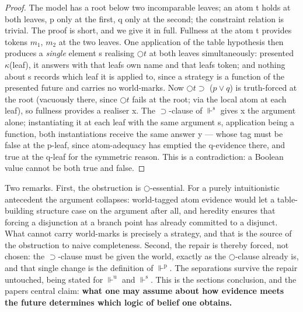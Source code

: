 \begin{proof}
The model has a root below two incomparable leaves; an atom t holds at
both leaves, p only at the first, q only at the second; the constraint
relation is trivial. The proof is short, and we give it in full. Fullness
at the atom t provides tokens \ensuremath{m_{1}}, \ensuremath{m_{2}} at the two leaves. One
application of the table hypothesis then produces a \emph{single} element s
realising \ensuremath{\bigcirc t} at both leaves simultaneously: presented \ensuremath{\kappa}(leaf), it
answers with that leaf\textquotesingle s own name and that leaf\textquotesingle s token; and nothing
about s records which leaf it is applied to, since a strategy is a function
of the presented future and carries no world-marks. Now \ensuremath{\bigcirc t \supset} (\ensuremath{p \vee q}) is
truth-forced at the root (vacuously there, since \ensuremath{\bigcirc t} fails at the root;
via the local atom at each leaf), so fullness provides a realiser x.
The \ensuremath{\supset}-clause of \ensuremath{\Vdash^{\mathrm{s}}} gives x the argument alone; instantiating it at each
leaf with the same argument s, application being a function, both
instantiations receive the same answer y --- whose tag must be false at
the p-leaf, since atom-adequacy has emptied the q-evidence there, and
true at the q-leaf for the symmetric reason. This is a contradiction: a
Boolean value cannot be both true and false.
\end{proof}

Two remarks. First, the obstruction is \ensuremath{\bigcirc}-essential. For a purely
intuitionistic antecedent the argument collapses: world-tagged atom
evidence would let a table-building structure case on the argument
after all, and heredity ensures that forcing a disjunction at a branch
point has already committed to a disjunct. What cannot carry
world-marks is precisely a strategy, and that is the source of the
obstruction to naive completeness.
Second, the repair is thereby forced, not chosen: the \ensuremath{\supset}-clause
must be given the world, exactly as the \ensuremath{\bigcirc}-clause already is, and that
single change is the definition of \ensuremath{\Vdash^{\mathrm{p}}}. The separations survive the
repair untouched, being stated for \ensuremath{\Vdash^{\mathrm{u}}} and \ensuremath{\Vdash^{\mathrm{s}}}. This is the section\textquotesingle s conclusion,
and the paper\textquotesingle s central claim: \textbf{what one may assume about how evidence
meets the future determines which logic of belief one obtains.}

